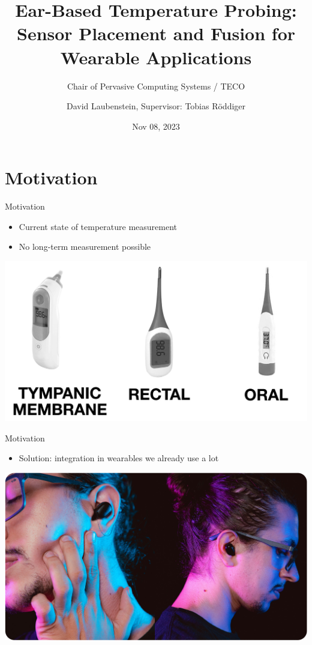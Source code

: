 \documentclass[en]{sdqbeamer}
\title[Ear-Based Temperature Probing]{Ear-Based Temperature Probing: \\ Sensor Placement and Fusion for Wearable Applications}
\subtitle{Chair of Pervasive Computing Systems / TECO}
\author[David Laubenstein]{David Laubenstein, Supervisor: Tobias Röddiger}
\date[11/08/2023]{Nov 08, 2023}
\begin{document}
 
\KITtitleframe


\section{Motivation}
\begin{frame}{Motivation}
    \begin{itemize}
        \item Current state of temperature measurement \cite{TemperatureDigitalGlassa}
        \item No long-term measurement possible
    \end{itemize}
    \begin{center}
        \includegraphics[scale=0.15]{proposal-presentation/images/thermometer_types.jpg}    
    \end{center}
\end{frame}

\begin{frame}{Motivation}
    \begin{itemize}
        \item Solution: integration in wearables we already use a lot
    \end{itemize}
    \begin{center}
        \includegraphics[scale=0.14]{proposal-presentation/images/inears/earbuds_picture.jpg}
    \end{center}
\end{frame}
\end{document}
